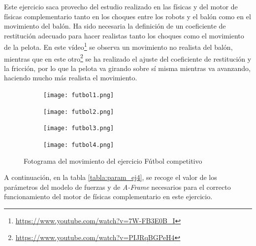 Este ejercicio saca provecho del estudio realizado en las físicas y del motor de físicas complementario tanto en los choques entre los robots y el balón como en el movimiento del balón. Ha sido necesaria la definición de un coeficiente de restitución adecuado para hacer realistas tanto los choques como el movimiento de la pelota. En este vídeo\footnote{\url{https://www.youtube.com/watch?v=7W-FB3E0B_I}} se observa un movimiento no realista del balón, mientras que en este otro\footnote{\url{https://www.youtube.com/watch?v=PIJRqBGPeH4}} se ha realizado el ajuste del coeficiente de restitución y la fricción, por lo que la pelota va girando sobre sí misma mientras va avanzando, haciendo mucho más realista el movimiento.

\clearpage

\begin{figure}[h!]
  \begin{subfigure}[b]{0.2\textwidth}
    \texttt{[image: futbol1.png]}
  \end{subfigure}
  \hfill
  \hfill
  \begin{subfigure}[b]{0.2\textwidth}
    \texttt{[image: futbol2.png]}
  \end{subfigure}
    \hfill
    \hfill
  \begin{subfigure}[b]{0.2\textwidth}
    \texttt{[image: futbol3.png]}
  \end{subfigure}
    \hfill
  \begin{subfigure}[b]{0.2\textwidth}
    \texttt{[image: futbol4.png]}
  \end{subfigure}
\caption{Fotograma del movimiento del ejercicio Fútbol competitivo}
\label{fig:movimiento_balón}
\end{figure}

A continuación, en la tabla \ref{tabla:param_ej4}, se recoge el valor de los parámetros del modelo de fuerzas y de  \textit{A-Frame} necesarios para el correcto funcionamiento del motor de físicas complementario en este ejercicio.

